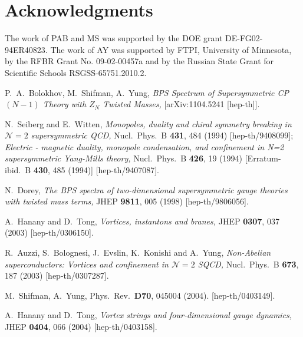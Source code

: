 \documentclass[epsfig,12pt]{article}
\begin{document}
\section*{Acknowledgments}
The work of PAB and MS was supported by the DOE grant DE-FG02-94ER40823.
The work of AY was  supported
by  FTPI, University of Minnesota,
by the RFBR Grant No. 09-02-00457a
and by the Russian State Grant for
Scientific Schools RSGSS-65751.2010.2.
	
	

\begin{thebibliography}{99}

  P.~A.~Bolokhov, M.~Shifman, A.~Yung,
{\em BPS Spectrum of Supersymmetric {\rm CP}$(N-1)$ Theory with $Z_N$ Twisted Masses,}
    [arXiv:1104.5241 [hep-th]].
    


  N.~Seiberg and E.~Witten,
{\em Monopoles, duality and chiral symmetry breaking in ${\mathcal N}=2$ supersymmetric QCD,}
  Nucl.\ Phys.\ B {\bf 431}, 484 (1994)
  [hep-th/9408099];
{\em Electric - magnetic duality, monopole condensation, and confinement in N=2 supersymmetric Yang-Mills theory,}
  Nucl.\ Phys.\ B {\bf 426}, 19 (1994)
  [Erratum-ibid.\ B {\bf 430}, 485 (1994)]
  [hep-th/9407087].

  N.~Dorey,
{\em The BPS spectra of two-dimensional supersymmetric gauge theories with twisted mass terms,}
  JHEP {\bf 9811}, 005 (1998)
  [hep-th/9806056].

   A.~Hanany and D.~Tong,
  {\em Vortices, instantons and branes,}
  JHEP {\bf 0307}, 037 (2003)
  [hep-th/0306150].
  
   R.~Auzzi, S.~Bolognesi, J.~Evslin, K.~Konishi and A.~Yung,
{\em Non-Abelian superconductors: Vortices and confinement in ${\mathcal N}=2$ SQCD,}
  Nucl.\ Phys.\ B {\bf 673}, 187 (2003)
  [hep-th/0307287].

  M.~Shifman, A.~Yung,
  Phys.\ Rev.\  {\bf D70}, 045004 (2004).
  [hep-th/0403149].

      A.~Hanany and D.~Tong,
{\em Vortex strings and four-dimensional gauge dynamics,}
  JHEP {\bf 0404}, 066 (2004)
  [hep-th/0403158].
  


\end{thebibliography}
\end{document}
